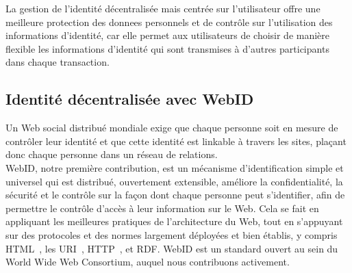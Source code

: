 La gestion de l'identité décentralisée mais centrée sur l'utilisateur offre une meilleure protection des donnees personnels et de contrôle sur l'utilisation des informations d'identité, car elle permet aux utilisateurs de choisir de manière flexible les informations d'identité qui sont transmises à d'autres participants dans chaque transaction.\\

\subsection*{Identité décentralisée avec WebID}
Un Web social distribué mondiale exige que chaque personne soit en mesure de contrôler leur identité et que cette identité est linkable à travers les sites, plaçant donc chaque personne dans un réseau de relations.\\


WebID, notre première contribution, est un mécanisme d'identification simple et universel qui est distribué, ouvertement extensible, améliore la confidentialité, la sécurité et le contrôle sur la façon dont chaque personne peut s'identifier, afin de permettre le contrôle d'accès à leur information sur le Web. Cela se fait en appliquant les meilleures pratiques de l'architecture du Web, tout en s'appuyant sur des protocoles et des normes largement déployées et bien établis, y compris HTML~\cite{berners1995hypertext}, les URI~\cite{berners1998uniform}, HTTP~\cite{berners1996hypertext}, et RDF. WebID est un standard ouvert au sein du World Wide Web Consortium, auquel nous contribuons activement.\\


